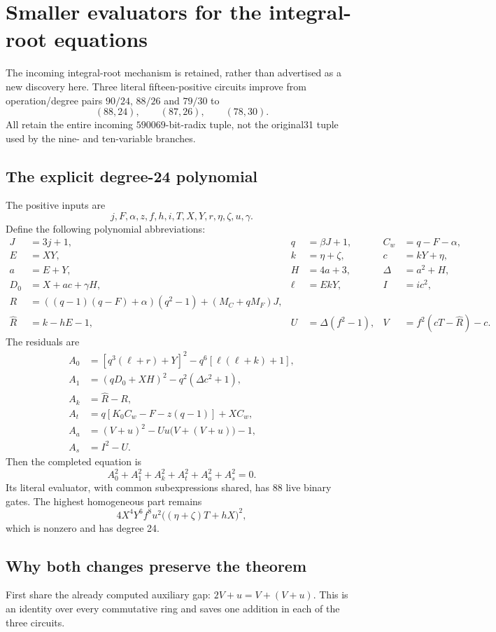 \section{Smaller evaluators for the integral-root equations}
The incoming integral-root mechanism is retained, rather than advertised as a new discovery here. Three literal fifteen-positive circuits improve from operation/degree pairs $90/24$, $88/26$ and $79/30$ to
\[
 (88,24),\qquad(87,26),\qquad(78,30).
\]
All retain the entire incoming $590069$-bit-radix tuple, not the original31 tuple used by the nine- and ten-variable branches.

\subsection{The explicit degree-24 polynomial}
The positive inputs are
\[
 j,F,\alpha,z,f,h,i,T,X,Y,r,\eta,\zeta,u,\gamma.
\]
Define the following polynomial abbreviations:
\begin{align*}
 J&=3j+1,&q&=\beta J+1,& C_w&=q-F-\alpha,\\
 E&=XY,&k&=\eta+\zeta,&c&=kY+\eta,\\
 a&=E+Y,&H&=4a+3,&\Delta&=a^2+H,\\
 D_0&=X+ac+\gamma H,&\ell&=EkY,&I&=ic^2,\\
 R&=((q-1)(q-F)+\alpha)(q^2-1)+(M_C+qM_F)J,\\
 \widehat R&=k-hE-1,&U&=\Delta(f^2-1),&V&=f^2(cT-\widehat R)-c.
\end{align*}
The residuals are
\begin{align*}
 A_0&=[q^3(\ell+r)+Y]^2-q^6[\ell(\ell+k)+1],\\
 A_1&=(qD_0+XH)^2-q^2(\Delta c^2+1),\\
 A_k&=\widehat R-R,\\
 A_t&=q[K_0C_w-F-z(q-1)]+XC_w,\\
 A_a&=(V+u)^2-Uu\bigl(V+(V+u)\bigr)-1,\\
 A_s&=I^2-U.
\end{align*}
Then the completed equation is
\[
 \boxed{A_0^2+A_1^2+A_k^2+A_t^2+A_a^2+A_s^2=0.}
\]
Its literal evaluator, with common subexpressions shared, has 88 live binary gates. The highest homogeneous part remains
\[
 4X^4Y^6f^8u^2\bigl((\eta+\zeta)T+hX\bigr)^2,
\]
which is nonzero and has degree 24.

\subsection{Why both changes preserve the theorem}
First share the already computed auxiliary gap: $2V+u=V+(V+u)$. This is an identity over every commutative ring and saves one addition in each of the three circuits.

